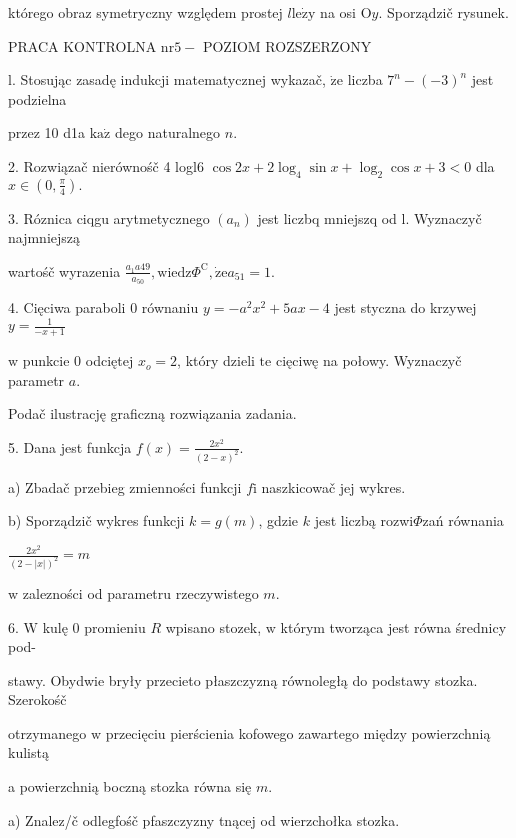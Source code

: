 \documentclass[a4paper,12pt]{article}
\begin{document}
którego obraz symetryczny względem prostej $l\mathrm{l}\mathrm{e}\dot{\mathrm{z}}\mathrm{y}$ na osi $\mathrm{O}y$. Sporządzič rysunek.





PRACA KONTROLNA $\mathrm{n}\mathrm{r}5-$ POZIOM ROZSZERZONY

l. Stosując zasadę indukcji matematycznej wykazač, $\dot{\mathrm{z}}\mathrm{e}$ liczba $7^{n}-(-3)^{n}$ jest podzielna

przez 10 d1a $\mathrm{k}\mathrm{a}\dot{\mathrm{z}}$ dego naturalnego $n.$

2. Rozwiązač nierównośč 4 logl6 $\cos 2x+2\log_{4}\sin x+\log_{2}\cos x+3<0$ dla $x\displaystyle \in(0,\frac{\pi}{4}).$

3. Róznica ciqgu arytmetycznego $(a_{n})$ jest liczbq mniejszq od l. Wyznaczyč najmniejszą

wartośč wyrazenia $\displaystyle \frac{a_{1}a49}{a_{50}}, \mathrm{w}\mathrm{i}\mathrm{e}\mathrm{d}\mathrm{z}\Phi^{\mathrm{C}}, \dot{\mathrm{z}}\mathrm{e}a_{51}=1.$

4. Cięciwa paraboli $0$ równaniu $y=-a^{2}x^{2}+5ax-4$ jest styczna do krzywej $y=\displaystyle \frac{1}{-x+1}$

$\mathrm{w}$ punkcie $0$ odciętej $x_{o}=2$, który dzieli $\mathrm{t}\mathrm{e}$ cięciwę na połowy. Wyznaczyč parametr $a.$

Podač ilustrację graficzną rozwiązania zadania.

5. Dana jest funkcja $f(x)=\displaystyle \frac{2x^{2}}{(2-x)^{2}}.$

a) Zbadač przebieg zmienności funkcji $f\mathrm{i}$ naszkicowač jej wykres.

b) Sporządzič wykres funkcji $k=g(m)$, gdzie $k$ jest liczbą rozwi$\Phi$zań równania

$\displaystyle \frac{2x^{2}}{(2-|x|)^{2}}=m$

$\mathrm{w}$ zalezności od parametru rzeczywistego $m.$

6. $\mathrm{W}$ kulę $0$ promieniu $R$ wpisano stozek, $\mathrm{w}$ którym tworząca jest równa średnicy pod-

stawy. Obydwie bryły przecieto płaszczyzną równoległą do podstawy stozka. Szerokośč

otrzymanego $\mathrm{w}$ przecięciu pierścienia kofowego zawartego między powierzchnią kulistą

a powierzchnią boczną stozka równa się $m.$

a) Znalez/č odlegfośč pfaszczyzny tnącej od wierzchołka stozka.
\end{document}
